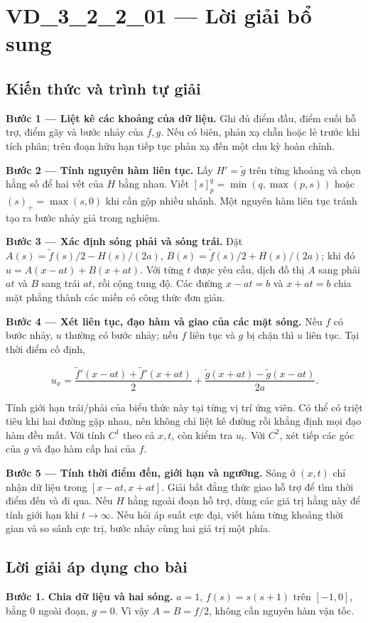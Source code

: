 \documentclass[10pt,a4paper]{article}
\begin{document}
\section*{VD\_3\_2\_2\_01 — Lời giải bổ sung}
\subsection*{Kiến thức và trình tự giải}
\textbf{Bước 1 — Liệt kê các khoảng của dữ liệu.} Ghi đủ điểm đầu, điểm cuối hỗ trợ, điểm gãy và bước nhảy của $f,g$. Nếu có biên, phản xạ chẵn hoặc lẻ trước khi tích phân; trên đoạn hữu hạn tiếp tục phản xạ đến một chu kỳ hoàn chỉnh.

\textbf{Bước 2 — Tính nguyên hàm liên tục.} Lấy $H'=\widetilde g$ trên từng khoảng và chọn hằng số để hai vết của $H$ bằng nhau. Viết $[s]_p^q=\min(q,\max(p,s))$ hoặc $(s)_+=\max(s,0)$ khi cần gộp nhiều nhánh. Một nguyên hàm liên tục tránh tạo ra bước nhảy giả trong nghiệm.

\textbf{Bước 3 — Xác định sóng phải và sóng trái.} Đặt $A(s)=\widetilde f(s)/2-H(s)/(2a)$, $B(s)=\widetilde f(s)/2+H(s)/(2a)$; khi đó $u=A(x-at)+B(x+at)$. Với từng $t$ được yêu cầu, dịch đồ thị $A$ sang phải $at$ và $B$ sang trái $at$, rồi cộng tung độ. Các đường $x-at=b$ và $x+at=b$ chia mặt phẳng thành các miền có công thức đơn giản.

\textbf{Bước 4 — Xét liên tục, đạo hàm và giao của các mặt sóng.} Nếu $f$ có bước nhảy, $u$ thường có bước nhảy; nếu $f$ liên tục và $g$ bị chặn thì $u$ liên tục. Tại thời điểm cố định,


\[
u_x=\frac{\widetilde f'(x-at)+\widetilde f'(x+at)}2+\frac{\widetilde g(x+at)-\widetilde g(x-at)}{2a}.
\]


Tính giới hạn trái/phải của biểu thức này tại từng vị trí ứng viên. Có thể có triệt tiêu khi hai đường gặp nhau, nên không chỉ liệt kê đường rồi khẳng định mọi đạo hàm đều mất. Với tính $C^1$ theo cả $x,t$, còn kiểm tra $u_t$. Với $C^2$, xét tiếp các góc của $g$ và đạo hàm cấp hai của $f$.

\textbf{Bước 5 — Tính thời điểm đến, giới hạn và ngưỡng.} Sóng ở $(x,t)$ chỉ nhận dữ liệu trong $[x-at,x+at]$. Giải bất đẳng thức giao hỗ trợ để tìm thời điểm đến và đi qua. Nếu $H$ hằng ngoài đoạn hỗ trợ, dùng các giá trị hằng này để tính giới hạn khi $t\to\infty$. Nếu hỏi áp suất cực đại, viết hàm từng khoảng thời gian và so sánh cực trị, bước nhảy cùng hai giá trị một phía.
\subsection*{Lời giải áp dụng cho bài}
\textbf{Bước 1. Chia dữ liệu và hai sóng.} $a=1$, $f(s)=s(s+1)$ trên $[-1,0]$, bằng $0$ ngoài đoạn, $g=0$. Vì vậy $A=B=f/2$, không cần nguyên hàm vận tốc.
\end{document}
